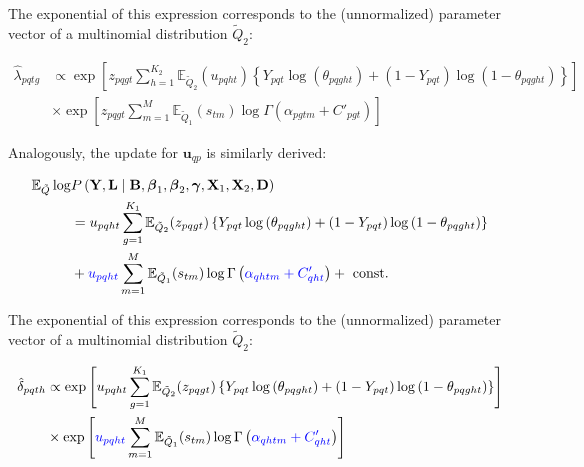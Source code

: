 \documentclass{article}
\begin{document}
The exponential of this expression corresponds to the (unnormalized) parameter vector of a multinomial distribution $\tilde{Q}_2$:

\begin{equation*}
\begin{aligned}
\hat \lambda_{pqtg} & \propto \exp \left[z_{p q g t} \sum_{h=1}^{K_{2}} \mathbb{E}_{\tilde{Q}_2} (u_{p q h t})\left\{Y_{p q t} \log \left(\theta_{p q g h t}\right)+\left(1 - Y_{p q t}\right) \log \left(1-\theta_{p q g h t}\right)\right\}  \right] \\
& \times \exp \left[ z_{p q g t} \sum_{m=1}^M \mathbb{E}_{\tilde{Q}_1} (s_{tm}) \log \Gamma\left(\alpha_{p g t m}+C'_{p g t}\right)\right]
\end{aligned}
\end{equation*}

Analogously, the update for $\mathbf{u}_{qp}$ is similarly derived:

\begin{equation*}
\begin{aligned} 
\mathbb{E}_{\tilde{Q}} \log & P\left(\mathbf{Y}, \mathbf{L} \mid \mathbf{B}, \boldsymbol{\beta}_{1}, \boldsymbol{\beta}_{2}, \boldsymbol{\gamma}, \mathbf{X}_{1}, \mathbf{X}_{2}, \mathbf{D}\right)  \\
 &= u_{p q h t} \sum_{g=1}^{K_{1}} \mathbb{E}_{\tilde{Q}_2} (z_{p q g t})\left\{Y_{p q t} \log \left(\theta_{p q g h t}\right)+\left(1 - Y_{p q t}\right) \log \left(1-\theta_{p q g h t}\right)\right\} \\
 &+ \textcolor{blue}{u_{p q h t}} \sum_{m=1}^M \mathbb{E}_{\tilde{Q}_1} (s_{tm}) \log \Gamma\left(\textcolor{blue}{\alpha_{q h t m}+C'_{q h t}}\right)+\text { const. } 
 \end{aligned}
\end{equation*}

The exponential of this expression corresponds to the (unnormalized) parameter vector of a multinomial distribution $\tilde{Q}_2$:

\begin{equation*}
\begin{aligned}
\hat \delta_{pqth} & \propto \exp \left[u_{p q h t} \sum_{g=1}^{K_{1}} \mathbb{E}_{\tilde{Q}_2} (z_{p q g t})\left\{Y_{p q t} \log \left(\theta_{p q g h t}\right)+\left(1 - Y_{p q t}\right) \log \left(1-\theta_{p q g h t}\right)\right\} \right] \\
& \times \exp \left[ \textcolor{blue}{u_{p q h t}} \sum_{m=1}^M \mathbb{E}_{\tilde{Q}_1} (s_{tm}) \log \Gamma\left(\textcolor{blue}{\alpha_{q h t m}+C'_{q h t}}\right)\right]
\end{aligned}
\end{equation*}
\end{document}
